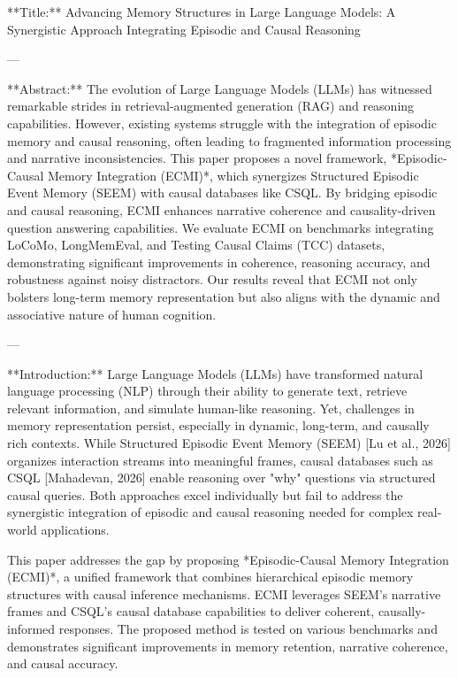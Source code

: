 **Title:**  
Advancing Memory Structures in Large Language Models: A Synergistic Approach Integrating Episodic and Causal Reasoning

---

**Abstract:**  
The evolution of Large Language Models (LLMs) has witnessed remarkable strides in retrieval-augmented generation (RAG) and reasoning capabilities. However, existing systems struggle with the integration of episodic memory and causal reasoning, often leading to fragmented information processing and narrative inconsistencies. This paper proposes a novel framework, *Episodic-Causal Memory Integration (ECMI)*, which synergizes Structured Episodic Event Memory (SEEM) with causal databases like CSQL. By bridging episodic and causal reasoning, ECMI enhances narrative coherence and causality-driven question answering capabilities. We evaluate ECMI on benchmarks integrating LoCoMo, LongMemEval, and Testing Causal Claims (TCC) datasets, demonstrating significant improvements in coherence, reasoning accuracy, and robustness against noisy distractors. Our results reveal that ECMI not only bolsters long-term memory representation but also aligns with the dynamic and associative nature of human cognition.  

---

**Introduction:**  
Large Language Models (LLMs) have transformed natural language processing (NLP) through their ability to generate text, retrieve relevant information, and simulate human-like reasoning. Yet, challenges in memory representation persist, especially in dynamic, long-term, and causally rich contexts. While Structured Episodic Event Memory (SEEM) [Lu et al., 2026] organizes interaction streams into meaningful frames, causal databases such as CSQL [Mahadevan, 2026] enable reasoning over "why" questions via structured causal queries. Both approaches excel individually but fail to address the synergistic integration of episodic and causal reasoning needed for complex real-world applications.  

This paper addresses the gap by proposing *Episodic-Causal Memory Integration (ECMI)*, a unified framework that combines hierarchical episodic memory structures with causal inference mechanisms. ECMI leverages SEEM's narrative frames and CSQL's causal database capabilities to deliver coherent, causally-informed responses. The proposed method is tested on various benchmarks and demonstrates significant improvements in memory retention, narrative coherence, and causal accuracy.


